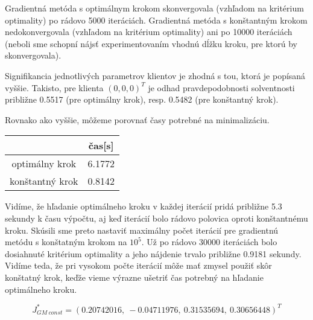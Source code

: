 \documentclass[report.tex]{subfiles}
\begin{document}
Gradientná metóda s optimálnym krokom skonvergovala (vzhľadom na kritérium optimality) po rádovo 5000 iteráciách. Gradientná metóda s konštantným krokom nedokonvergovala (vzhľadom na kritérium optimality) ani po 10000 iteráciách (neboli sme schopní nájsť experimentovaním vhodnú dĺžku kroku, pre ktorú by skonvergovala). 

Signifikancia jednotlivých parametrov klientov je zhodná s tou, ktorá je popísaná vyššie. Takisto, pre klienta $(0,0,0)^T$ je odhad pravdepodobnosti solventnosti približne 0.5517 (pre optimálny krok), resp. 0.5482 (pre konštantný krok).

Rovnako ako vyššie, môžeme porovnať časy potrebné na minimalizáciu.

\begin{center}
	\small
	\begin{tabular}{| c | c |}
		\hline
		& čas[s]  \\
		\hline
		optimálny krok & 6.1772  \\
		konštantný krok & 0.8142  \\
		\hline
	\end{tabular}
\end{center}

Vidíme, že hľadanie optimálneho kroku v každej iterácií pridá približne 5.3 sekundy k času výpočtu, aj keď iterácií bolo rádovo polovica oproti konštantnému kroku. Skúsili sme preto nastaviť maximálny počet iterácií pre gradientnú metódu s konštatným krokom na $10^5$. Už po rádovo 30000 iteráciách bolo dosiahnuté kritérium optimality a jeho nájdenie trvalo približne 0.9181 sekundy. Vidíme teda, že pri vysokom počte iterácií môže mať zmysel použiť skôr konštatný krok, keďže vieme výrazne ušetriť čas potrebný na hľadanie optimálneho kroku. 

\begin{equation*}
	J^*_{GM~const} = (0.20742016,~-0.04711976,~0.31535694,~0.30656448)^T
\end{equation*}
\end{document}
